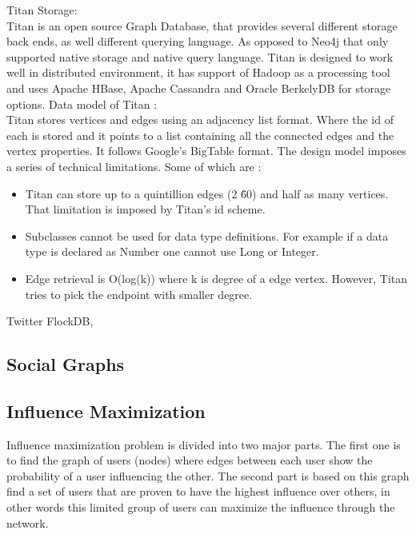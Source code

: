 \documentclass[english]{tktltiki}
\begin{document}
Titan Storage: \\
Titan is an open source Graph Database, that provides several different storage back ends, as well different querying language. As opposed to Neo4j that only supported native storage and native query language. Titan is designed to work well in distributed environment, it has support of Hadoop as a processing tool and uses Apache HBase, Apache Cassandra and Oracle BerkelyDB for storage options. 
Data model of Titan : \\
Titan stores vertices and edges using an adjacency list format. Where the id of each is stored and it points to a list containing all the connected edges and the vertex properties. It follows Google's BigTable format. The design model imposes a series of technical limitations. Some of which are : 
\begin{itemize}
\item 
Titan can store up to a quintillion edges (2 \^ 60) and half as many vertices. That limitation is imposed by Titan's id scheme.
\item
Subclasses cannot be used for data type definitions. For example if a data type is declared as Number one cannot use Long or Integer. 
\item
Edge retrieval is O(log(k)) where k is degree of a edge vertex. However, Titan tries to pick the endpoint with smaller degree.

\end{itemize}

Twitter FlockDB, 








\subsection{Social Graphs}




\subsection{Influence Maximization}
Influence maximization problem is divided into two major parts. The first one is to find the graph of users (nodes) where edges between each user show the probability of  a user influencing the other. The second part is
based on this graph find a set of users that are proven to have the highest influence over others, in other words 
this limited group of users can maximize the influence through the network.
\end{document}
